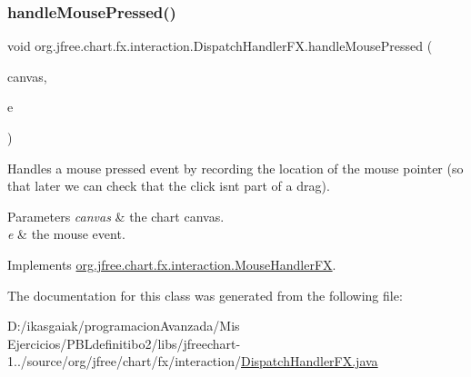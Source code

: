 \subsubsection{\texorpdfstring{handle\+Mouse\+Pressed()}{handleMousePressed()}}
{\footnotesize\ttfamily void org.\+jfree.\+chart.\+fx.\+interaction.\+Dispatch\+Handler\+F\+X.\+handle\+Mouse\+Pressed (\begin{DoxyParamCaption}\item[{\mbox{\hyperlink{classorg_1_1jfree_1_1chart_1_1fx_1_1_chart_canvas}{Chart\+Canvas}}}]{canvas,  }\item[{Mouse\+Event}]{e }\end{DoxyParamCaption})}

Handles a mouse pressed event by recording the location of the mouse pointer (so that later we can check that the click isn\textquotesingle{}t part of a drag).


\begin{DoxyParams}{Parameters}
{\em canvas} & the chart canvas. \\
\hline
{\em e} & the mouse event. \\
\hline
\end{DoxyParams}


Implements \mbox{\hyperlink{interfaceorg_1_1jfree_1_1chart_1_1fx_1_1interaction_1_1_mouse_handler_f_x_a0cf92e5a448b58c199fc12dbdbd39aab}{org.\+jfree.\+chart.\+fx.\+interaction.\+Mouse\+Handler\+FX}}.



The documentation for this class was generated from the following file\+:\begin{DoxyCompactItemize}
\item 
D\+:/ikasgaiak/programacion\+Avanzada/\+Mis Ejercicios/\+P\+B\+Ldefinitibo2/libs/jfreechart-\/1../source/org/jfree/chart/fx/interaction/\mbox{\hyperlink{_dispatch_handler_f_x_8java}{Dispatch\+Handler\+F\+X.\+java}}\end{DoxyCompactItemize}
